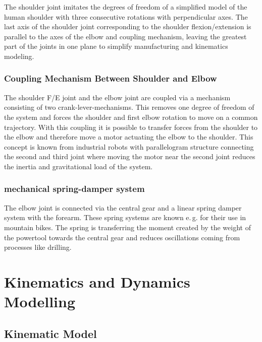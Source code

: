 \documentclass[letterpaper, 10 pt, conference]{ieeeconf}  %
\begin{document}
The shoulder joint imitates the degrees of freedom of a simplified model of the human shoulder with three consecutive rotations with perpendicular axes.
The last axis of the shoulder joint corresponding to the shoulder flexion/extension is parallel to the axes of the elbow and coupling mechanism, leaving the greatest part of the joints in one plane to simplify manufacturing and kinematics modeling.

\subsubsection{Coupling Mechanism Between Shoulder and Elbow}

The shoulder F/E joint and the elbow joint are coupled via a mechanism consisting of two crank-lever-mechanisms.
This removes one degree of freedom of the system and forces the shoulder and first elbow rotation to move on a common trajectory.
With this coupling it is possible to transfer forces from the shoulder to the elbow and therefore move a motor actuating the elbow to the shoulder.
This concept is known from industrial robots with parallelogram structure connecting the second and third joint where moving the motor near the second joint reduces the inertia and gravitational load of the system.

\subsubsection{mechanical spring-damper system}

The elbow joint is connected via the central gear and a linear spring damper system with the forearm.
These spring systems are known e.\,g. for their use in mountain bikes.
The spring is transferring the moment created by the weight of the powertool towards the central gear and reduces oscillations coming from processes like drilling.

\section{Kinematics and Dynamics Modelling}

\subsection{Kinematic Model}
\end{document}

